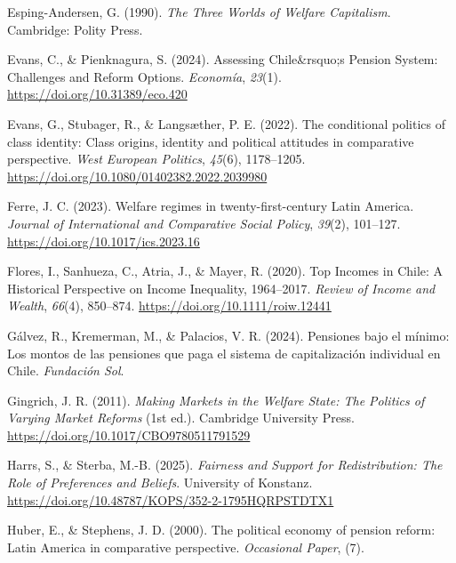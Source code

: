 \documentclass[
  12pt,
]{article}
\newlength{\cslhangindent}
\newenvironment{CSLReferences}[2] %
 {\begin{list}{}{%
  \setlength{\itemindent}{0pt}
  \setlength{\leftmargin}{0pt}
  \setlength{\parsep}{0pt}
  \ifodd #1
   \setlength{\leftmargin}{\cslhangindent}
   \setlength{\itemindent}{-1\cslhangindent}
  \fi
  \setlength{\itemsep}{#2\baselineskip}}}
 {\end{list}}
\begin{document}
\begin{CSLReferences}{1}{0}
Esping-Andersen, G. (1990). \emph{The {Three Worlds} of {Welfare
Capitalism}}. Cambridge: Polity Press.

Evans, C., \& Pienknagura, S. (2024). Assessing {Chile}\&rsquo;s
{Pension System}: {Challenges} and {Reform Options}. \emph{Economía},
\emph{23}(1). \url{https://doi.org/10.31389/eco.420}

Evans, G., Stubager, R., \& Langsæther, P. E. (2022). The conditional
politics of class identity: Class origins, identity and political
attitudes in comparative perspective. \emph{West European Politics},
\emph{45}(6), 1178--1205.
\url{https://doi.org/10.1080/01402382.2022.2039980}

Ferre, J. C. (2023). Welfare regimes in twenty-first-century {Latin
America}. \emph{Journal of International and Comparative Social Policy},
\emph{39}(2), 101--127. \url{https://doi.org/10.1017/ics.2023.16}

Flores, I., Sanhueza, C., Atria, J., \& Mayer, R. (2020). Top {Incomes}
in {Chile}: {A Historical Perspective} on {Income Inequality},
1964--2017. \emph{Review of Income and Wealth}, \emph{66}(4), 850--874.
\url{https://doi.org/10.1111/roiw.12441}

Gálvez, R., Kremerman, M., \& Palacios, V. R. (2024). {Pensiones bajo el
mínimo: Los montos de las pensiones que paga el sistema de
capitalización individual en Chile}. \emph{Fundación Sol}.

Gingrich, J. R. (2011). \emph{Making {Markets} in the {Welfare State}:
{The Politics} of {Varying Market Reforms}} (1st ed.). Cambridge
University Press. \url{https://doi.org/10.1017/CBO9780511791529}

Harrs, S., \& Sterba, M.-B. (2025). \emph{Fairness and {Support} for
{Redistribution}: {The Role} of {Preferences} and {Beliefs}}. University
of Konstanz. \url{https://doi.org/10.48787/KOPS/352-2-1795HQRPSTDTX1}

Huber, E., \& Stephens, J. D. (2000). The political economy of pension
reform: {Latin America} in comparative perspective. \emph{Occasional
Paper}, (7).


\end{CSLReferences}
\end{document}
